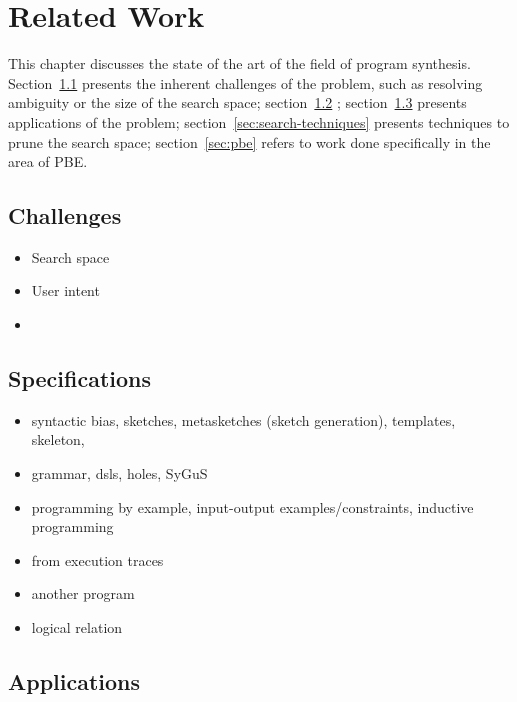 \chapter{Related Work}
\label{chapter:relatedWork}


This chapter discusses the state of the art of the field of program synthesis.
Section~\ref{sec:challenges} presents the inherent challenges of the problem,
such as resolving ambiguity or the size of the search space;
section~\ref{sec:specifications} ;
section~\ref{sec:applications}
presents applications of the problem; section~\ref{sec:search-techniques}
presents techniques to prune the search space; section~\ref{sec:pbe} refers to
work done specifically in the area of \ac{PBE}.

\section{Challenges}
\label{sec:challenges}

\begin{itemize}
\item Search space
\item User intent
  \item 
\end{itemize}

\section{Specifications}
\label{sec:specifications}

\begin{itemize}
\item syntactic bias, sketches, metasketches (sketch generation), templates, skeleton,
\item   grammar, dsls, holes, SyGuS
\item programming by example, input-output examples/constraints, inductive programming
\item from execution traces
\item another program
\item logical relation
\end{itemize}

\section{Applications}
\label{sec:applications}


